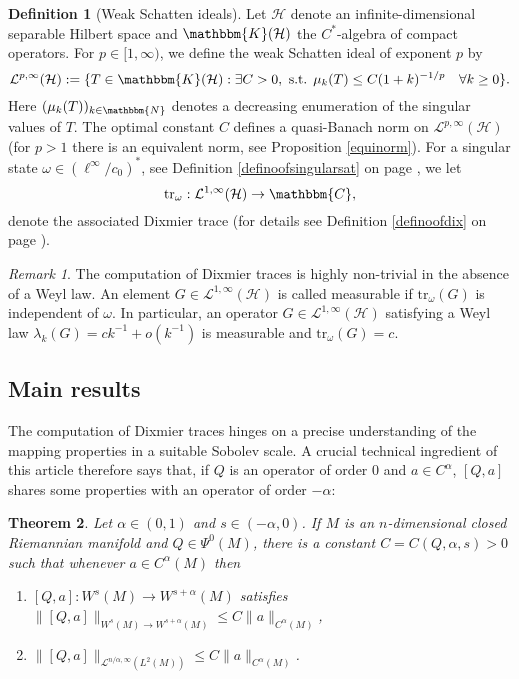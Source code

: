 \documentclass[10pt]{amsart}
\newtheorem{thm*}{Theorem}
\theoremstyle{remark}
\newtheorem{remark}[thm]{Remark}
\theoremstyle{definition}
\newtheorem{deef*}[thm*]{Definition}
\begin{document}
\begin{deef*}[Weak Schatten ideals]
\label{defofweaklp}
Let ${\mathcal{H}}$ denote an infinite-dimensional separable Hilbert space and ${\mathbbm{K}}({\mathcal{H}})$ the $C^*$-algebra of compact operators. For $p\in [1,\infty)$, we define the weak Schatten ideal of exponent $p$ by 
$$\mathcal{L}^{p,\infty}({\mathcal{H}}):=\{T\in {\mathbbm{K}}({\mathcal{H}}): \exists C>0, \mbox{   s.t.   } \mu_k(T)\leq C(1+k)^{-1/p}\quad\forall k\geq 0\}.$$
Here $(\mu_k(T))_{k\in {\mathbbm{N}}}$ denotes a decreasing enumeration of the singular values of $T$. The optimal constant $C$ defines a quasi-Banach norm on $\mathcal{L}^{p,\infty}({\mathcal{H}})$ (for $p>1$ there is an equivalent norm, see Proposition \ref{equinorm}). For a singular state $\omega\in (\ell^\infty/c_0)^*$, see Definition \ref{definoofsingularsat} on page \pageref{definoofsingularsat}, we let 
$${\mathrm{t}\mathrm{r}}_\omega:\mathcal{L}^{1,\infty}({\mathcal{H}})\to {\mathbbm{C}},$$
denote the associated Dixmier trace (for details see Definition \ref{definoofdix} on page \pageref{definoofdix}). 
\end{deef*}

\begin{remark}
The computation of Dixmier traces is highly non-trivial in the absence of a Weyl law. An element $G\in \mathcal{L}^{1,\infty}({\mathcal{H}})$ is called measurable if ${\mathrm{t}\mathrm{r}}_\omega(G)$ is independent of $\omega$. In particular, an operator $G\in \mathcal{L}^{1,\infty}({\mathcal{H}})$ satisfying a Weyl law $\lambda_k(G)=ck^{-1}+o(k^{-1})$ is measurable and ${\mathrm{t}\mathrm{r}}_\omega(G)=c$.
\end{remark}

\subsection{Main results}

The computation of Dixmier traces hinges on a precise understanding of the mapping properties in a suitable Sobolev scale. A crucial technical ingredient of this article therefore says that, if $Q$ is an operator of order $0$ and $a \in C^{\alpha}$, $[Q,a]$ shares some properties with an operator of order $- \alpha$:

\begin{thm*}
\label{introsobregthm}
Let $\alpha\in(0,1)$ and $s\in (-\alpha,0)$. If $M$ is an $n$-dimensional closed Riemannian manifold and $Q\in \Psi^0(M)$, there is a constant $C=C(Q,\alpha,s)>0$ such that whenever $a\in C^\alpha(M)$ then
\begin{enumerate}
\item[a)] $[Q,a]:W^s(M)\to W^{s+\alpha}(M)$ satisfies $\|[Q,a]\|_{W^s(M)\to W^{s+\alpha}(M)}\leq C\|a\|_{C^\alpha(M)}$,
\item[b)] $\|[Q,a]\|_{\mathcal{L}^{n/\alpha,\infty}(L^2(M))}\leq C\|a\|_{C^\alpha(M)}$. 
\end{enumerate}
\end{thm*}
\end{document}
